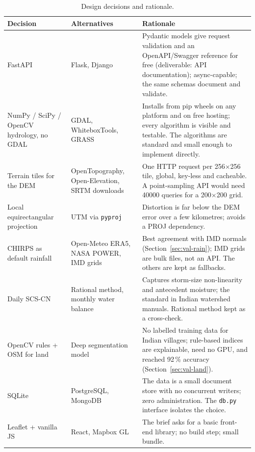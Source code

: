 \documentclass[11pt,a4paper]{article}
\begin{document}
\begin{table}[H]
\centering\small
\caption{Design decisions and rationale.}
\label{tab:decisions}
\begin{tabularx}{\textwidth}{@{}>{\raggedright\arraybackslash}p{2.7cm}>{\raggedright\arraybackslash}p{3.0cm}Y@{}}
\toprule
Decision & Alternatives & Rationale \\
\midrule
FastAPI & Flask, Django & Pydantic models give request validation and an OpenAPI/Swagger reference for free (deliverable: API documentation); async-capable; the same schemas document and validate. \\
NumPy / SciPy / OpenCV hydrology, no GDAL & GDAL, WhiteboxTools, GRASS & Installs from pip wheels on any platform and on free hosting; every algorithm is visible and testable. The algorithms are standard and small enough to implement directly. \\
Terrain tiles for the DEM & OpenTopography, Open-Elevation, SRTM downloads & One HTTP request per 256$\times$256 tile, global, key-less and cacheable. A point-sampling API would need \num{40000} queries for a \num{200}$\times$\num{200} grid. \\
Local equirectangular projection & UTM via \texttt{pyproj} & Distortion is far below the DEM error over a few kilometres; avoids a PROJ dependency. \\
CHIRPS as default rainfall & Open-Meteo ERA5, NASA POWER, IMD grids & Best agreement with IMD normals (Section~\ref{sec:val-rain}); IMD grids are bulk files, not an API. The others are kept as fallbacks. \\
Daily SCS-CN & Rational method, monthly water balance & Captures storm-size non-linearity and antecedent moisture; the standard in Indian watershed manuals. Rational method kept as a cross-check. \\
OpenCV rules + OSM for land & Deep segmentation model & No labelled training data for Indian villages; rule-based indices are explainable, need no GPU, and reached 92\,\% accuracy (Section~\ref{sec:val-land}). \\
SQLite & PostgreSQL, MongoDB & The data is a small document store with no concurrent writers; zero administration. The \texttt{db.py} interface isolates the choice. \\
Leaflet + vanilla JS & React, Mapbox GL & The brief asks for a basic front-end library; no build step; small bundle. \\
\bottomrule
\end{tabularx}
\end{table}
\end{document}
